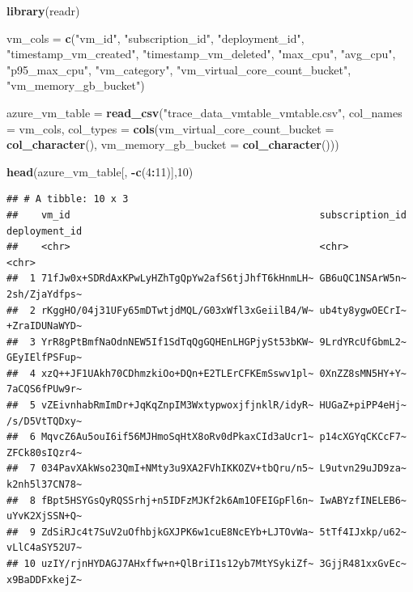 \documentclass[
]{article}
\newenvironment{Shaded}{\begin{snugshade}}{\end{snugshade}}
\newcommand{\AttributeTok}[1]{\textcolor[rgb]{0.13,0.29,0.53}{#1}}
\newcommand{\DecValTok}[1]{\textcolor[rgb]{0.00,0.00,0.81}{#1}}
\newcommand{\FunctionTok}[1]{\textcolor[rgb]{0.13,0.29,0.53}{\textbf{#1}}}
\newcommand{\NormalTok}[1]{#1}
\newcommand{\OtherTok}[1]{\textcolor[rgb]{0.56,0.35,0.01}{#1}}
\newcommand{\SpecialCharTok}[1]{\textcolor[rgb]{0.81,0.36,0.00}{\textbf{#1}}}
\newcommand{\StringTok}[1]{\textcolor[rgb]{0.31,0.60,0.02}{#1}}
\begin{document}
\begin{Shaded}
\begin{Highlighting}[]
\FunctionTok{library}\NormalTok{(readr)}

\NormalTok{vm\_cols }\OtherTok{=} \FunctionTok{c}\NormalTok{(}\StringTok{"vm\_id"}\NormalTok{, }\StringTok{"subscription\_id"}\NormalTok{, }\StringTok{"deployment\_id"}\NormalTok{, }\StringTok{"timestamp\_vm\_created"}\NormalTok{, }\StringTok{"timestamp\_vm\_deleted"}\NormalTok{, }\StringTok{"max\_cpu"}\NormalTok{, }
            \StringTok{"avg\_cpu"}\NormalTok{, }\StringTok{"p95\_max\_cpu"}\NormalTok{, }\StringTok{"vm\_category"}\NormalTok{, }\StringTok{"vm\_virtual\_core\_count\_bucket"}\NormalTok{, }\StringTok{"vm\_memory\_gb\_bucket"}\NormalTok{)}

\NormalTok{azure\_vm\_table }\OtherTok{=} \FunctionTok{read\_csv}\NormalTok{(}\StringTok{"trace\_data\_vmtable\_vmtable.csv"}\NormalTok{, }\AttributeTok{col\_names =}\NormalTok{ vm\_cols, }
                          \AttributeTok{col\_types =} \FunctionTok{cols}\NormalTok{(}\AttributeTok{vm\_virtual\_core\_count\_bucket =} \FunctionTok{col\_character}\NormalTok{(), }\AttributeTok{vm\_memory\_gb\_bucket =} \FunctionTok{col\_character}\NormalTok{()))}

\FunctionTok{head}\NormalTok{(azure\_vm\_table[, }\SpecialCharTok{{-}}\FunctionTok{c}\NormalTok{(}\DecValTok{4}\SpecialCharTok{:}\DecValTok{11}\NormalTok{)],}\DecValTok{10}\NormalTok{)}
\end{Highlighting}
\end{Shaded}

\begin{verbatim}
## # A tibble: 10 x 3
##    vm_id                                           subscription_id deployment_id
##    <chr>                                           <chr>           <chr>        
##  1 71fJw0x+SDRdAxKPwLyHZhTgQpYw2afS6tjJhfT6kHnmLH~ GB6uQC1NSArW5n~ 2sh/ZjaYdfps~
##  2 rKggHO/04j31UFy65mDTwtjdMQL/G03xWfl3xGeiilB4/W~ ub4ty8ygwOECrI~ +ZraIDUNaWYD~
##  3 YrR8gPtBmfNaOdnNEW5If1SdTqQgGQHEnLHGPjySt53bKW~ 9LrdYRcUfGbmL2~ GEyIElfPSFup~
##  4 xzQ++JF1UAkh70CDhmzkiOo+DQn+E2TLErCFKEmSswv1pl~ 0XnZZ8sMN5HY+Y~ 7aCQS6fPUw9r~
##  5 vZEivnhabRmImDr+JqKqZnpIM3WxtypwoxjfjnklR/idyR~ HUGaZ+piPP4eHj~ /s/D5VtTQDxy~
##  6 MqvcZ6Au5ouI6if56MJHmoSqHtX8oRv0dPkaxCId3aUcr1~ p14cXGYqCKCcF7~ ZFCk80sIQzr4~
##  7 034PavXAkWso23QmI+NMty3u9XA2FVhIKKOZV+tbQru/n5~ L9utvn29uJD9za~ k2nh5l37CN78~
##  8 fBpt5HSYGsQyRQSSrhj+n5IDFzMJKf2k6Am1OFEIGpFl6n~ IwABYzfINELEB6~ uYvK2XjSSN+Q~
##  9 ZdSiRJc4t7SuV2uOfhbjkGXJPK6w1cuE8NcEYb+LJTOvWa~ 5tTf4IJxkp/u62~ vLlC4aSY52U7~
## 10 uzIY/rjnHYDAGJ7AHxffw+n+QlBriI1s12yb7MtYSykiZf~ 3GjjR481xxGvEc~ x9BaDDFxkejZ~
\end{verbatim}
\end{document}
